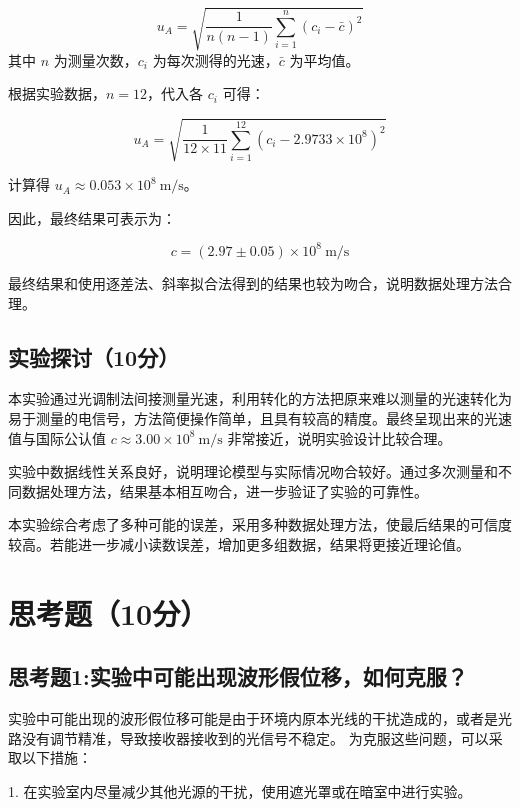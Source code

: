 \documentclass{Phyport}
\begin{document}
\begin{equation}
    u_A = \sqrt{\frac{1}{n(n-1)} \sum_{i=1}^n (c_i - \bar{c})^2}
\end{equation}
其中 $n$ 为测量次数，$c_i$ 为每次测得的光速，$\bar{c}$ 为平均值。

根据实验数据，$n=12$，代入各 $c_i$ 可得：

\begin{equation}
    u_A = \sqrt{\frac{1}{12 \times 11} \sum_{i=1}^{12} (c_i - 2.9733 \times 10^8)^2}
\end{equation}

计算得 $u_A \approx 0.053 \times 10^8\ \mathrm{m/s}$。

因此，最终结果可表示为：

\begin{equation}
    c = (2.97 \pm 0.05) \times 10^8\ \mathrm{m/s}
\end{equation}

最终结果和使用逐差法、斜率拟合法得到的结果也较为吻合，说明数据处理方法合理。

\subsection{实验探讨（10分）}
本实验通过光调制法间接测量光速，利用转化的方法把原来难以测量的光速转化为易于测量的电信号，方法简便操作简单，且具有较高的精度。最终呈现出来的光速值与国际公认值 $c \approx 3.00 \times 10^8\ \mathrm{m/s}$ 非常接近，说明实验设计比较合理。

实验中数据线性关系良好，说明理论模型与实际情况吻合较好。通过多次测量和不同数据处理方法，结果基本相互吻合，进一步验证了实验的可靠性。

本实验综合考虑了多种可能的误差，采用多种数据处理方法，使最后结果的可信度较高。若能进一步减小读数误差，增加更多组数据，结果将更接近理论值。


\newpage
\section{思考题（10分）}
\subsection{思考题1:实验中可能出现波形假位移，如何克服？}

实验中可能出现的波形假位移可能是由于环境内原本光线的干扰造成的，或者是光路没有调节精准，导致接收器接收到的光信号不稳定。
为克服这些问题，可以采取以下措施：

1. 在实验室内尽量减少其他光源的干扰，使用遮光罩或在暗室中进行实验。
\end{document}
